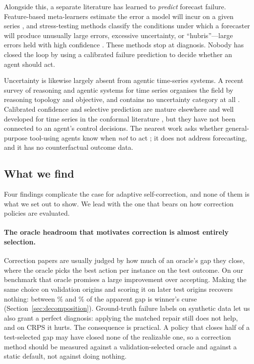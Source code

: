 Alongside this, a separate literature has learned to \emph{predict} forecast failure.
Feature-based meta-learners estimate the error a model will incur on a given series
\citep{fformpp2019}, and stress-testing methods classify the conditions under which a
forecaster will produce unusually large errors, excessive uncertainty, or
``hubris''---large errors held with high confidence \citep{mast2025}. These methods stop
at diagnosis. Nobody has closed the loop by using a calibrated failure prediction to
decide whether an agent should act.

Uncertainty is likewise largely absent from agentic time-series systems. A recent survey
of reasoning and agentic systems for time series organises the field by reasoning
topology and objective, and contains no uncertainty category at all
\citep{tsreasoningsurvey2026}. Calibrated confidence and selective prediction are mature
elsewhere \citep{geifman2017selective,guo2017calibration} and well developed for time
series in the conformal literature \citep{gibbs2021aci,cptc2025}, but they have not been
connected to an agent's control decisions. The nearest work asks whether general-purpose
tool-using agents know when \emph{not} to act \citep{agentabstain2026}; it does not
address forecasting, and it has no counterfactual outcome data.

\subsection{What we find}

Four findings complicate the case for adaptive self-correction, and none of them is
what we set out to show. We lead with the one that bears on how correction policies are evaluated.

\paragraph{The oracle headroom that motivates correction is almost entirely
selection.}
Correction papers are usually judged by how much of an oracle's gap they close, where
the oracle picks the best action per instance on the test outcome. On our benchmark
that oracle promises a large improvement over accepting. Making the same choice on
validation origins and scoring it on later test origins recovers nothing: between
\rdCrpsCurseShare\% and \rdMaseCurseShare\% of the apparent gap is winner's
curse (Section~\ref{sec:decomposition}). Ground-truth failure labels on synthetic
data let us also grant a perfect diagnosis: applying the matched repair still does not
help, and on CRPS it hurts. The consequence is practical. A policy that closes half of
a test-selected gap may have closed none of the realizable one, so a correction method
should be measured against a validation-selected oracle and against a static default,
not against doing nothing.

